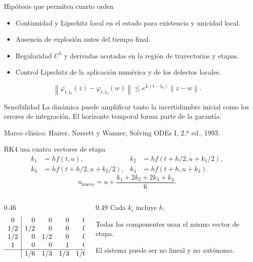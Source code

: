 \documentclass[aspectratio=169,11pt]{beamer}
\newcommand{\norm}[1]{\left\lVert#1\right\rVert}
\newcommand{\source}[1]{\vfill{\tiny\color{graytext}#1}}
\begin{document}
\begin{frame}{Hipótesis que permiten cuarto orden}
\begin{itemize}
\item Continuidad y Lipschitz local en el estado para existencia y unicidad local.
\item Ausencia de explosión antes del tiempo final.
\item Regularidad $C^5$ y derivadas acotadas en la región de trayectorias y etapas.
\item Control Lipschitz de la aplicación numérica y de los defectos locales.
\end{itemize}
\[
\norm{\varphi_{t,t_0}(z)-\varphi_{t,t_0}(w)}
\leq e^{L(t-t_0)}\norm{z-w}.
\]
\begin{block}{Sensibilidad}
La dinámica puede amplificar tanto la incertidumbre inicial como los errores
de integración. El horizonte temporal forma parte de la garantía.
\end{block}
\source{Marco clásico: Hairer, Nørsett y Wanner, Solving ODEs I, 2.ª ed., 1993.}
\end{frame}

\begin{frame}{RK4 usa cuatro vectores de etapa}
\begin{align*}
k_1&=h f(t,u),&
k_2&=h f(t+h/2,u+k_1/2),\\
k_3&=h f(t+h/2,u+k_2/2),&
k_4&=h f(t+h,u+k_3).
\end{align*}
\[
u_{\mathrm{nuevo}}=u+\frac{k_1+2k_2+2k_3+k_4}{6}.
\]
\begin{columns}[T]
\begin{column}{0.46\textwidth}
\[
\begin{array}{c|rrrr}
0&0&0&0&0\\
1/2&1/2&0&0&0\\
1/2&0&1/2&0&0\\
1&0&0&1&0\\\hline
&1/6&1/3&1/3&1/6
\end{array}
\]
\end{column}
\begin{column}{0.49\textwidth}
\vspace{0.3cm}
Cada $k_i$ incluye $h$.\par\vspace{0.2cm}
Todas las componentes usan el mismo vector de etapa.\par\vspace{0.2cm}
El sistema puede ser no lineal y no autónomo.
\end{column}
\end{columns}
\end{frame}
\end{document}
